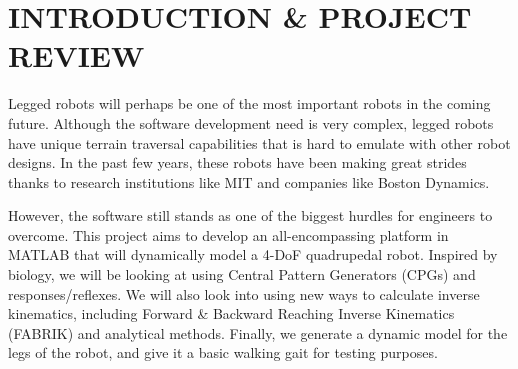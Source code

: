 \section{INTRODUCTION \& PROJECT REVIEW}
Legged robots will perhaps be one of the most important robots in the coming future. Although the software development need is very complex, legged robots have unique terrain traversal capabilities that is hard to emulate with other robot designs. In the past few years, these robots have been making great strides thanks to research institutions like MIT and companies like Boston Dynamics. 

However, the software still stands as one of the biggest hurdles for engineers to overcome. This project aims to develop an all-encompassing platform in MATLAB that will dynamically model a 4-DoF quadrupedal robot. Inspired by biology, we will be looking at using Central Pattern Generators (CPGs) and responses/reflexes. We will also look into using new ways to calculate inverse kinematics, including Forward \& Backward Reaching Inverse Kinematics (FABRIK) and analytical methods. Finally, we generate a dynamic model for the legs of the robot, and give it a basic walking gait for testing purposes.